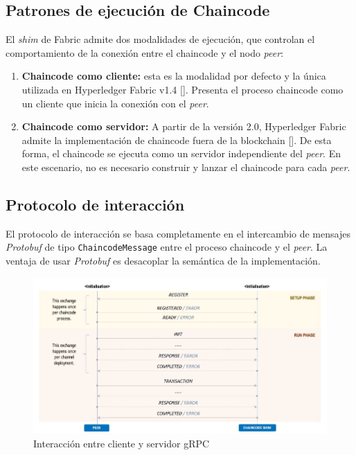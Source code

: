 \subsection*{Patrones de ejecución de Chaincode}

El \textit{shim} de Fabric admite dos modalidades de ejecución, que controlan el comportamiento de la conexión entre el chaincode y el nodo \textit{peer}:

\begin{enumerate}
\item \textbf{Chaincode como cliente:} esta es la modalidad por defecto y la única utilizada en Hyperledger Fabric v1.4 [\cite{hlf-internals}]. Presenta el proceso chaincode como un cliente que inicia la conexión con el \textit{peer}.

\item \textbf{Chaincode como servidor:} A partir de la versión 2.0, Hyperledger Fabric admite la implementación de chaincode fuera de la blockchain [\cite{hlf-internals}]. De esta forma, el chaincode se ejecuta como un servidor independiente del \textit{peer}. En este escenario, no es necesario construir y lanzar el chaincode para cada \textit{peer}.
\end{enumerate}

\subsection*{Protocolo de interacción}
El protocolo de interacción se basa completamente en el intercambio de mensajes \textit{Protobuf} de tipo \texttt{ChaincodeMessage} entre el proceso chaincode y el \textit{peer}. La ventaja de usar \textit{Protobuf} es desacoplar la semántica de la implementación.

\begin{figure}[tbph]
\centering
\includegraphics[width=\textwidth]{Images/interaction_protocol}
\caption{Interacción entre cliente y servidor gRPC}
\label{fig:interactionprotocol}
\end{figure}

